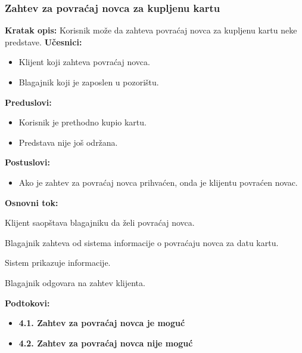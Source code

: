 \documentclass[a4paper]{article}
\begin{document}
\subsubsection{Zahtev za povraćaj novca za kupljenu kartu}  
\noindent\textbf{Kratak opis:} Korisnik može da zahteva povraćaj novca za kupljenu kartu neke predstave.
\noindent\textbf{Učesnici:} 
  \begin{itemize}
    \item Klijent koji zahteva povraćaj novca.
    \item Blagajnik koji je zaposlen u pozorištu.
  \end{itemize}

  \noindent\textbf{Preduslovi:} 
  \begin{itemize}
    \item Korisnik je prethodno kupio kartu.
    \item Predstava nije još održana.
  \end{itemize}

  \noindent\textbf{Postuslovi:} 
  \begin{itemize}
    \item Ako je zahtev za povraćaj novca prihvaćen, onda je klijentu povraćen novac.
  \end{itemize}

  \noindent\textbf{Osnovni tok:}
  \begin{legal}
    \item Klijent saopštava blagajniku da želi povraćaj novca.
    \item Blagajnik zahteva od sistema informacije o povraćaju novca za datu kartu.
    \item Sistem prikazuje informacije.
    \item Blagajnik odgovara na zahtev klijenta.
  \end{legal}

  \noindent\textbf{Podtokovi:}
  \begin{itemize}
    \item \textbf{4.1. Zahtev za povraćaj novca je moguć}
    \item \textbf{4.2. Zahtev za povraćaj novca nije moguć}
  \end{itemize}
\end{document}
